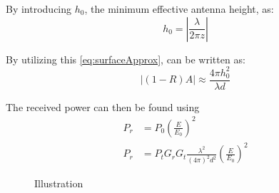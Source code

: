 By introducing $h_0$, the minimum effective antenna height, as:
\begin{equation}
h_0=\left| \frac{\lambda}{2\pi z} \right|
\end{equation} 
\begin{where}
\end{where}

By utilizing this \autoref{eq:surfaceApprox}, can be written as:
\begin{equation}
|(1-R)A| \approx \frac{4 \pi h_0^2}{\lambda d}
\end{equation}

The received power can then be found using\citep{Chong}
\begin{align}
P_r&=P_0 \left(\frac{E}{E_0}\right)^2 \\
P_r&=P_tG_rG_t\frac{\lambda^2}{(4\pi )^2 d^2} \left(\frac{E}{E_0}\right)^2
\end{align}
\begin{where}
\end{where}


\begin{figure}[H]
\centering

\caption{Illustration}
\label{fig:Ill}
\end{figure}















